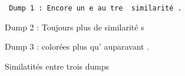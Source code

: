 \begin{figure}[!h]
  \begin{center}
  {\tt
  {Dump 1 : \color{dissimColor} Encore un}{\color{otherSimColor} e au}{\color{dissimColor} tre }{\color{simColor} similarité}{\color{dissimColor} .}

  {Dump 2 : \color{dissimColor} Toujours }{\color{simColor} plus }{\color{dissimColor} de }{\color{simColor} similarité}{\color{dissimColor} s}

  {Dump 3 : \color{dissimColor} colorées }{\color{simColor} plus }{\color{dissimColor} qu'}{\color{otherSimColor} auparavant}{\color{dissimColor} .}
  }
  \end{center}
  \caption{Similatités entre trois dumps}
  \label{04-1-sim_mult}
\end{figure}